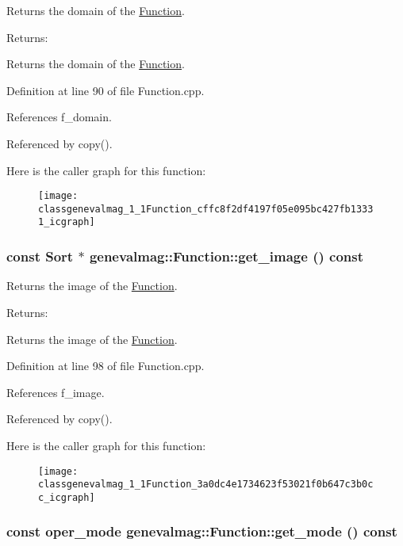 Returns the domain of the \hyperlink{classgenevalmag_1_1Function}{Function}. \begin{Desc}
\item[Returns:]\end{Desc}
Returns the domain of the \hyperlink{classgenevalmag_1_1Function}{Function}. 

Definition at line 90 of file Function.cpp.

References f\_\-domain.

Referenced by copy().

Here is the caller graph for this function:\nopagebreak
\begin{figure}[H]
\begin{center}
\leavevmode
\texttt{[image: classgenevalmag\_1\_1Function\_cffc8f2df4197f05e095bc427fb13331\_icgraph]}
\end{center}
\end{figure}
\hypertarget{classgenevalmag_1_1Function_3a0dc4e1734623f53021f0b647c3b0cc}{
\subsubsection[{get\_\-image}]{\setlength{\rightskip}{0pt plus 5cm}const {\bf Sort} $\ast$ genevalmag::Function::get\_\-image () const}}
\label{classgenevalmag_1_1Function_3a0dc4e1734623f53021f0b647c3b0cc}


Returns the image of the \hyperlink{classgenevalmag_1_1Function}{Function}. \begin{Desc}
\item[Returns:]\end{Desc}
Returns the image of the \hyperlink{classgenevalmag_1_1Function}{Function}. 

Definition at line 98 of file Function.cpp.

References f\_\-image.

Referenced by copy().

Here is the caller graph for this function:\nopagebreak
\begin{figure}[H]
\begin{center}
\leavevmode
\texttt{[image: classgenevalmag\_1\_1Function\_3a0dc4e1734623f53021f0b647c3b0cc\_icgraph]}
\end{center}
\end{figure}
\hypertarget{classgenevalmag_1_1Function_6db7c2695f9cce41c24e5cfea7406dd6}{
\subsubsection[{get\_\-mode}]{\setlength{\rightskip}{0pt plus 5cm}const {\bf oper\_\-mode} genevalmag::Function::get\_\-mode () const}}
\label{classgenevalmag_1_1Function_6db7c2695f9cce41c24e5cfea7406dd6}


